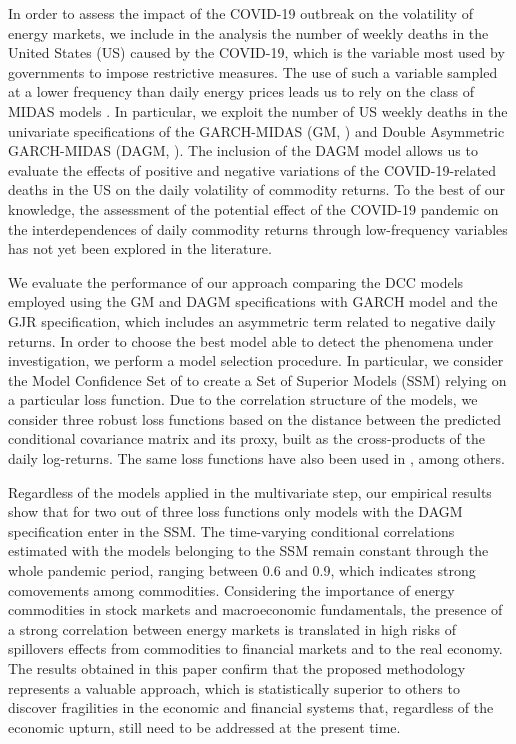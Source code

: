 In order to assess the impact of the COVID-19 outbreak on the volatility of energy markets, we include in the analysis the number of weekly deaths in the {United States (US)} caused by the COVID-19, which is the variable most used by  governments to impose restrictive measures. The use of such a variable sampled at a lower frequency than daily energy prices leads us to rely on the class of MIDAS models \citep{Ghysels:Sinko:Valkanov:2007}. 
In particular,  {we exploit the number of US weekly deaths in the univariate specifications of the GARCH-MIDAS (GM, \citealp{Engle:Ghysels:Sohn:2013}) and Double Asymmetric GARCH-MIDAS (DAGM, \citealp{Amendola:Candila:Gallo:2019}). The inclusion of the DAGM model allows us to evaluate the effects of positive and negative variations of the COVID-19-related deaths in the US on the daily volatility of commodity returns.}
To the best of our knowledge, the assessment of the potential effect of the COVID-19 pandemic on the interdependences of daily commodity returns through low-frequency variables has not yet been explored in the literature.

We evaluate the performance of our approach comparing the DCC models employed using the GM and DAGM specifications with GARCH model and the GJR \citep{Glosten:Jaganathan:Runkle:1993} specification, which includes an asymmetric term related to negative daily returns.  
{In order to choose the best model able to detect the phenomena under investigation, we perform a model selection procedure. In particular, we consider the Model Confidence Set of \cite{Hansen:Lunde:Nason:2011} to create a Set of Superior Models (SSM) relying on a particular loss function. Due to the correlation structure of the models, we consider three robust loss functions \citep{laurent2013loss} based on the distance between the predicted conditional covariance matrix and} {its proxy, built as the cross-products of the daily log-returns. The same loss functions have also been used in \cite{Amendola:Braione:Candila:Storti:2020}, among others.}

Regardless of the models applied in the multivariate step, our empirical results show that for two out of three loss functions only models with the DAGM specification enter in the SSM. The time-varying conditional correlations estimated with the models belonging to the SSM remain constant through the whole pandemic period, ranging between 0.6 and 0.9, which indicates strong comovements among commodities.
Considering the importance of energy commodities in stock markets and macroeconomic fundamentals, the presence of a strong correlation between energy markets is translated in  high risks of spillovers effects from commodities to financial markets and to the real economy. The results obtained in this paper confirm that the proposed methodology represents a valuable approach, which is statistically superior to others to discover fragilities in the economic and financial systems that, regardless of the economic upturn, still need to be addressed at the present time.
 
